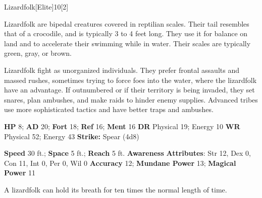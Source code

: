   \begin{monsection}{Lizardfolk}[Elite]{10}[2]
    \vspace{-1em}\vspace{-1em}
    \vspace{0em}

    
    Lizardfolk are bipedal creatures covered in reptilian scales.
    Their tail resembles that of a crocodile, and is typically 3 to 4 feet long.
    They use it for balance on land and to accelerate their swimming while in water.
    Their scales are typically green, gray, or brown.

    Lizardfolk fight as unorganized individuals.
    They prefer frontal assaults and massed rushes, sometimes trying to force foes into the water, where the lizardfolk have an advantage.
    If outnumbered or if their territory is being invaded, they set snares, plan ambushes, and make raids to hinder enemy supplies.
    Advanced tribes use more sophisticated tactics and have better traps and ambushes.
  

    \begin{spellcontent}
      \begin{spelltargetinginfo}
        \pari \textbf{HP} 8;
          \textbf{AD} 20;
          \textbf{Fort} 18;
          \textbf{Ref} 16;
          \textbf{Ment} 16
        \pari \textbf{DR} Physical 19; Energy 10
        \pari \textbf{WR} Physical 52; Energy 43
        \pari \textbf{Strike:}
            Spear  (4d8)
      \end{spelltargetinginfo}
    \end{spellcontent}
    \begin{monsterfooter}
      \pari \textbf{Speed} 30 ft.;
        \textbf{Space} 5 ft.;
        \textbf{Reach} 5 ft.
      \pari \textbf{Awareness} 
      \pari \textbf{Attributes}:
        Str 12, Dex 0,
        Con 11, Int 0,
        Per 0, Wil 0
      \pari \textbf{Accuracy} 12;
        \textbf{Mundane Power} 13;
      \textbf{Magical Power} 11
    \end{monsterfooter}
  \end{monsection}
   A lizardfolk can hold its breath for ten times the normal length of time.
  
